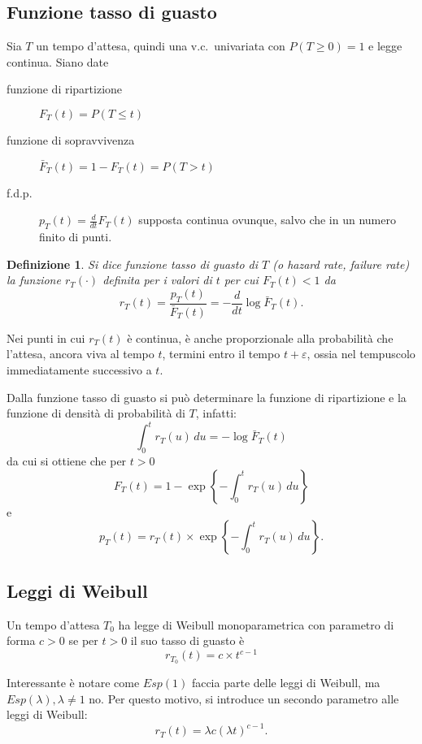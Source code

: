 \documentclass[11pt,a4paper,twoside]{article}
\newtheorem{definition}{Definizione}
\let\epsilon\varepsilon%
\let\leq\leqslant%
\let\geq\geqslant%
\newcommand\du{\,du}
\newcommand\FS{\bar{F}}
\begin{document}
\subsection{Funzione tasso di guasto}
Sia \(T\) un tempo d'attesa, quindi una v.c.\ univariata con \(P(T\geq
0) = 1\) e legge continua. Siano date
\begin{description}
\item[funzione di ripartizione] \(F_T(t) = P(T \leq t)\)
\item[funzione di sopravvivenza] \(\FS_T(t) = 1-F_T(t) = P(T > t)\)
\item[f.d.p.] \(p_T(t) = \frac d{dt} F_T(t)\) supposta continua
  ovunque, salvo che in un numero finito di punti.
\end{description}

\begin{definition}
  Si dice funzione tasso di guasto di \(T\) (o \textit{hazard rate},
  \textit{failure rate}) la funzione \(r_T(\cdot)\) definita per i
  valori di \(t\) per cui \(F_T(t) < 1\) da
  \[
    r_T(t) = \frac{p_T(t)}{\FS_T(t)} = - \frac d{dt} \log\FS_T(t) .
  \]
\end{definition}

Nei punti in cui \(r_T(t)\) è continua, è anche proporzionale alla
probabilità che l'attesa, ancora viva al tempo \(t\), termini entro il
tempo \(t+\epsilon\), ossia nel tempuscolo immediatamente successivo a
\(t\).

Dalla funzione tasso di guasto si può determinare la funzione di
ripartizione e la funzione di densità di probabilità di \(T\),
infatti:
\[
  \int_0^t r_T(u) \du = -\log \FS_T(t)
\]
da cui si ottiene che per \(t > 0\)
\[
  F_T(t) = 1 - \exp \left\{ - \int_0^t r_T(u) \du \right\}
\]
e
\[
  p_T(t) = r_T(t) \times \exp \left\{ -\int_0^t r_T(u) \du \right\} .
\]

\subsection{Leggi di Weibull}

Un tempo d'attesa \(T_0\) ha legge di Weibull monoparametrica con
parametro di forma \(c>0\) se per \(t>0\) il suo tasso di guasto è
\[
  r_{T_0}(t) = c \times t^{c-1}
\]

Interessante è notare come \(Esp(1)\) faccia parte delle leggi di
Weibull, ma \(Esp(\lambda), \lambda \neq 1\) no.  Per questo motivo,
si introduce un secondo parametro alle leggi di Weibull:
\[
  r_T(t) = \lambda c (\lambda t)^{c-1} .
\]
\end{document}
